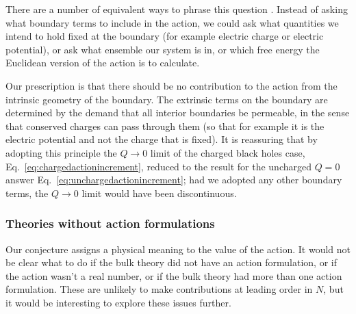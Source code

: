 \documentclass[12pt]{article}
\numberwithin{equation}{section}
\begin{document}
There are a number of equivalent ways to phrase this question \cite{Braden:1990hw,Hawking:1995ap}. Instead of asking what boundary terms to include in the action, we could  ask what quantities we intend to hold fixed at the boundary (for example electric charge or  electric potential), or ask what ensemble our system is in, or which free energy the Euclidean version of the action is to calculate.

Our prescription is that  there should be no contribution to the action from the intrinsic geometry of the boundary. The extrinsic terms on the boundary are determined by the demand that all interior boundaries be permeable, in the sense that conserved charges can pass through them (so that for example it is the electric potential and not the charge that is fixed). It is reassuring that by adopting this principle the $Q \rightarrow 0$ limit of the charged black holes case, Eq.~\ref{eq:chargedactionincrement}, reduced to the result for the uncharged $Q=0$ answer Eq.~\ref{eq:unchargedactionincrement}; had we adopted any other boundary terms, the $Q \rightarrow 0$ limit would have been discontinuous.





\subsubsection{Theories without action formulations}

Our conjecture assigns a physical meaning to the value of the action.  It would not be clear what to do if the bulk theory did not have an action formulation, or if the action wasn't a real number,
or if the bulk theory  had more than one action formulation. These are unlikely to make contributions at leading order in $N$, but it would be interesting to explore these issues further.



\end{document}
